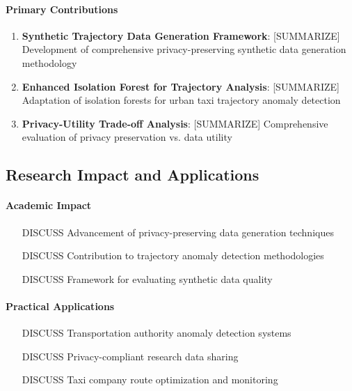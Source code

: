 \documentclass[runningheads]{llncs}
\begin{document}
\paragraph{Primary Contributions}
\begin{enumerate}
\item \textbf{Synthetic Trajectory Data Generation Framework}: [SUMMARIZE] Development of comprehensive privacy-preserving synthetic data generation methodology

\item \textbf{Enhanced Isolation Forest for Trajectory Analysis}: [SUMMARIZE] Adaptation of isolation forests for urban taxi trajectory anomaly detection

\item \textbf{Privacy-Utility Trade-off Analysis}: [SUMMARIZE] Comprehensive evaluation of privacy preservation vs. data utility
\end{enumerate}

\subsection{Research Impact and Applications}

\paragraph{Academic Impact}
\begin{itemize}
\item [DISCUSS] Advancement of privacy-preserving data generation techniques
\item [DISCUSS] Contribution to trajectory anomaly detection methodologies
\item [DISCUSS] Framework for evaluating synthetic data quality
\end{itemize}

\paragraph{Practical Applications}
\begin{itemize}
\item [DISCUSS] Transportation authority anomaly detection systems
\item [DISCUSS] Privacy-compliant research data sharing
\item [DISCUSS] Taxi company route optimization and monitoring
\end{itemize}
\end{document}
